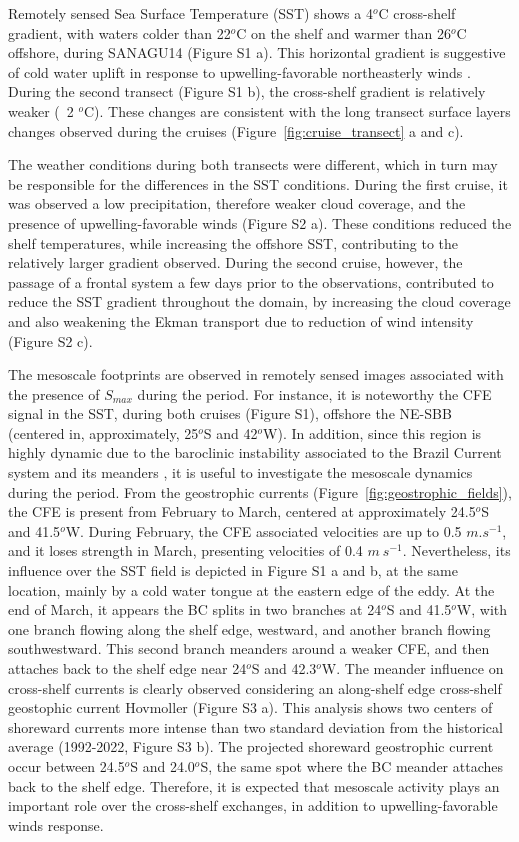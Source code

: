 \documentclass[draft]{agujournal2019}
\begin{document}
Remotely sensed Sea Surface Temperature (SST) shows a 4$^o$C cross-shelf gradient, with waters colder than 22$^o$C on the shelf and warmer than 26$^o$C offshore, during SANAGU14 (Figure S1 a). This horizontal gradient is suggestive of cold water uplift in response to upwelling-favorable northeasterly winds \cite{emilsson1961shelf,dottori2023}. During the second transect (Figure S1 b), the cross-shelf gradient is relatively weaker (~2 $^o$C). These changes are consistent with the long transect surface layers changes observed during the cruises (Figure~\ref{fig:cruise_transect} a and c).

The weather conditions during both transects were different, which in turn may be responsible for the differences in the SST conditions. During the first cruise, it was observed a low precipitation, therefore weaker cloud coverage, and the presence of upwelling-favorable winds (Figure S2 a). These conditions reduced the shelf temperatures, while increasing the offshore SST, contributing to the relatively larger gradient observed. During the second cruise, however, the passage of a frontal system a few days prior to the observations, contributed to reduce the SST gradient throughout the domain, by increasing the cloud coverage and also weakening the Ekman transport due to reduction of wind intensity (Figure S2 c).

The mesoscale footprints are observed in remotely sensed images associated with the presence of \textit{$S_{max}$} during the period. For instance, it is noteworthy the CFE signal in the SST, during both cruises (Figure S1), offshore the NE-SBB (centered in, approximately, 25$^o$S and 42$^o$W). In addition, since this region is highly dynamic due to the baroclinic instability associated to the Brazil Current system and its meanders \cite{silveira2008,uchoa2023}, it is useful to investigate the mesoscale dynamics during the period. From the geostrophic currents (Figure~\ref{fig:geostrophic_fields}), the CFE is present from February to March, centered at approximately 24.5$^o$S and 41.5$^o$W. During February, the CFE associated velocities are up to 0.5 $m.s^{-1}$, and it loses strength in March, presenting velocities of 0.4 $m\ s^{-1}$. Nevertheless, its influence over the SST field is depicted in Figure S1 a and b, at the same location, mainly by a cold water tongue at the eastern edge of the eddy. At the end of March, it appears the BC splits in two branches at 24$^o$S and 41.5$^o$W, with one branch flowing along the shelf edge, westward, and another branch flowing southwestward. This second branch meanders around a weaker CFE, and then attaches back to the shelf edge near 24$^o$S and 42.3$^o$W. The meander influence on cross-shelf currents is clearly observed considering an along-shelf edge cross-shelf geostophic current Hovmoller (Figure S3 a). This analysis shows two centers of shoreward currents more intense than two standard deviation from the historical average (1992-2022, Figure S3 b). The projected shoreward geostrophic current occur between 24.5$^o$S and 24.0$^o$S, the same spot where the BC meander attaches back to the shelf edge. Therefore, it is expected that mesoscale activity plays an important role over the cross-shelf exchanges, in addition to upwelling-favorable winds response.
\end{document}
